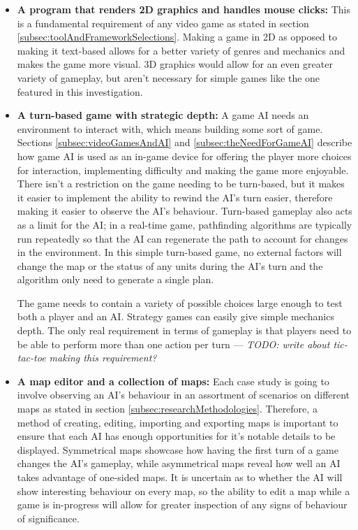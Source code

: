\documentclass[11pt, a4paper]{report}
\begin{document}
\begin{itemize}

\item \textbf{A program that renders 2D graphics and handles mouse clicks:}
This is a fundamental requirement of any video game as stated in section \ref{subsec:toolAndFrameworkSelections}. Making a game in 2D as opposed to making it text-based allows for a better variety of genres and mechanics and makes the game more visual. 3D graphics would allow for an even greater variety of gameplay, but aren't necessary for simple games like the one featured in this investigation.

\item \textbf{A turn-based game with strategic depth:}
A game AI needs an environment to interact with, which means building some sort of game. Sections \ref{subsec:videoGamesAndAI} and \ref{subsec:theNeedForGameAI} describe how game AI is used as an in-game device for offering the player more choices for interaction, implementing difficulty and making the game more enjoyable. There isn't a restriction on the game needing to be turn-based, but it makes it easier to implement the ability to rewind the AI's turn easier, therefore making it easier to observe the AI's behaviour. Turn-based gameplay also acts as a limit for the AI; in a real-time game, pathfinding algorithms are typically run repeatedly so that the AI can regenerate the path to account for changes in the environment. In this simple turn-based game, no external factors will change the map or the status of any units during the AI's turn and the algorithm only need to generate a single plan.

The game needs to contain a variety of possible choices large enough to test both a player and an AI. Strategy games can easily give simple mechanics depth. The only real requirement in terms of gameplay is that players need to be able to perform more than one action per turn --- \emph{TODO: write about tic-tac-toe making this requirement?}

\item \textbf{A map editor and a collection of maps:}
Each case study is going to involve observing an AI's behaviour in an assortment of scenarios on different maps as stated in section \ref{subsec:researchMethodologies}. Therefore, a method of creating, editing, importing and exporting maps is important to ensure that each AI has enough opportunities for it's notable details to be displayed. Symmetrical maps showcase how having the first turn of a game changes the AI's gameplay, while asymmetrical maps reveal how well an AI takes advantage of one-sided maps. It is uncertain as to whether the AI will show interesting behaviour on every map, so the ability to edit a map while a game is in-progress will allow for greater inspection of any signs of behaviour of significance.


\end{itemize}
\end{document}
